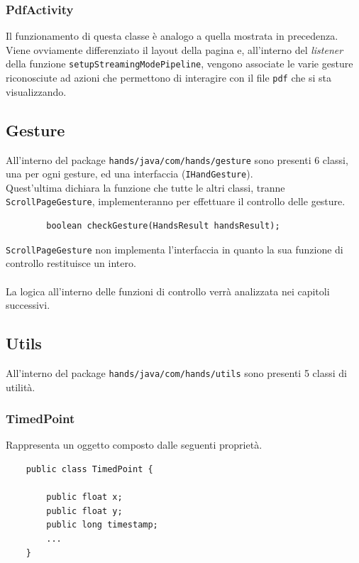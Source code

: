 \subsubsection{PdfActivity}
Il funzionamento di questa classe è analogo a quella mostrata in precedenza. Viene ovviamente differenziato il layout della pagina e, all'interno del \textit{listener} della funzione \texttt{setupStreamingModePipeline}, vengono associate le varie gesture riconosciute ad azioni che permettono di interagire con il file \texttt{pdf} che si sta visualizzando.


\subsection{Gesture}
All'interno del package \texttt{hands/java/com/hands/gesture} sono presenti 6 classi, una per ogni gesture, ed una interfaccia (\texttt{IHandGesture}).\\
Quest'ultima dichiara la funzione che tutte le altri classi, tranne \texttt{ScrollPageGesture}, implementeranno per effettuare il controllo delle gesture.
\begin{center}
    \begin{verbatim}
        boolean checkGesture(HandsResult handsResult);
    \end{verbatim}
\end{center}
\noindent \texttt{ScrollPageGesture} non implementa l'interfaccia in quanto la sua funzione di controllo restituisce un intero.\\
\\
\noindent La logica all'interno delle funzioni di controllo verrà analizzata nei capitoli successivi.

\subsection{Utils}
All'interno del package \texttt{hands/java/com/hands/utils} sono presenti 5 classi di utilità.\\
\subsubsection{TimedPoint}
Rappresenta un oggetto composto dalle seguenti proprietà.
\begin{verbatim}
    public class TimedPoint {

        public float x;
        public float y;
        public long timestamp;
        ...
    }
\end{verbatim}

